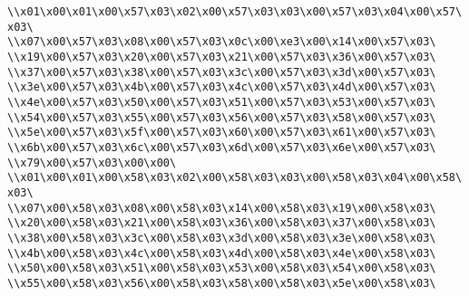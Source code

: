 \verb|\\x01\x00\x01\x00\x57\x03\x02\x00\x57\x03\x03\x00\x57\x03\x04\x00\x57\x03\|\newline
\verb|\\x07\x00\x57\x03\x08\x00\x57\x03\x0c\x00\xe3\x00\x14\x00\x57\x03\|\newline
\verb|\\x19\x00\x57\x03\x20\x00\x57\x03\x21\x00\x57\x03\x36\x00\x57\x03\|\newline
\verb|\\x37\x00\x57\x03\x38\x00\x57\x03\x3c\x00\x57\x03\x3d\x00\x57\x03\|\newline
\verb|\\x3e\x00\x57\x03\x4b\x00\x57\x03\x4c\x00\x57\x03\x4d\x00\x57\x03\|\newline
\verb|\\x4e\x00\x57\x03\x50\x00\x57\x03\x51\x00\x57\x03\x53\x00\x57\x03\|\newline
\verb|\\x54\x00\x57\x03\x55\x00\x57\x03\x56\x00\x57\x03\x58\x00\x57\x03\|\newline
\verb|\\x5e\x00\x57\x03\x5f\x00\x57\x03\x60\x00\x57\x03\x61\x00\x57\x03\|\newline
\verb|\\x6b\x00\x57\x03\x6c\x00\x57\x03\x6d\x00\x57\x03\x6e\x00\x57\x03\|\newline
\verb|\\x79\x00\x57\x03\x00\x00\|\newline
\verb|\\x01\x00\x01\x00\x58\x03\x02\x00\x58\x03\x03\x00\x58\x03\x04\x00\x58\x03\|\newline
\verb|\\x07\x00\x58\x03\x08\x00\x58\x03\x14\x00\x58\x03\x19\x00\x58\x03\|\newline
\verb|\\x20\x00\x58\x03\x21\x00\x58\x03\x36\x00\x58\x03\x37\x00\x58\x03\|\newline
\verb|\\x38\x00\x58\x03\x3c\x00\x58\x03\x3d\x00\x58\x03\x3e\x00\x58\x03\|\newline
\verb|\\x4b\x00\x58\x03\x4c\x00\x58\x03\x4d\x00\x58\x03\x4e\x00\x58\x03\|\newline
\verb|\\x50\x00\x58\x03\x51\x00\x58\x03\x53\x00\x58\x03\x54\x00\x58\x03\|\newline
\verb|\\x55\x00\x58\x03\x56\x00\x58\x03\x58\x00\x58\x03\x5e\x00\x58\x03\|\newline
